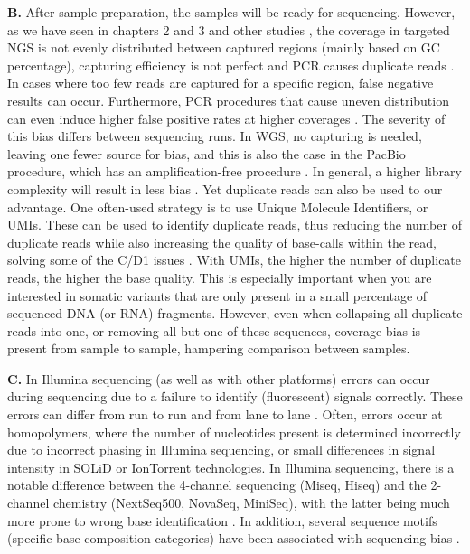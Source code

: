 \textbf{B.} After sample preparation, the samples will be ready for sequencing. 
However, as we have seen in chapters 2 and 3 and other studies \cite{Ross_2013}, the coverage in targeted NGS is not evenly distributed between captured regions (mainly based on GC percentage), capturing efficiency is not perfect and PCR causes duplicate reads \cite{Head_2014}. 
In cases where too few reads are captured for a specific region, false negative results can occur. 
Furthermore, PCR procedures that cause uneven distribution can even induce higher false positive rates at higher coverages \cite{Wall_2014}. 
The severity of this bias differs between sequencing runs. 
In WGS, no capturing is needed, leaving one fewer source for bias, and this is also the case in the PacBio procedure, which has an amplification-free procedure \cite{Quail_2012}. 
In general, a higher library complexity will result in less bias \cite{Head_2014}. 
Yet duplicate reads can also be used to our advantage. 
One often-used strategy  is to use Unique Molecule Identifiers, or UMIs. 
These can be used to identify duplicate reads, thus reducing the number of duplicate reads while also increasing the quality of base-calls within the read, solving some of the C/D1 issues \cite{Smith_2017a}. 
With UMIs, the higher the number of duplicate reads, the higher the base quality. 
This is especially important when you are interested in somatic variants that are only present in a small percentage of sequenced DNA (or RNA) fragments. 
However, even when collapsing all duplicate reads into one, or removing all but one of these sequences, coverage bias is present from sample to sample, hampering comparison between samples.

\textbf{C.} In Illumina sequencing (as well as with other platforms) errors can occur during sequencing  due to a failure to identify (fluorescent) signals correctly. 
These errors can differ from run to run and from lane to lane \cite{Aird_2011}. 
Often, errors occur at homopolymers, where the number of nucleotides present is determined incorrectly due to incorrect phasing in Illumina sequencing, or small differences in signal intensity in SOLiD or IonTorrent technologies. 
In Illumina sequencing, there is a notable difference between the 4-channel sequencing (Miseq, Hiseq) and the 2-channel chemistry (NextSeq500, NovaSeq, MiniSeq), with the latter being much more prone to wrong base identification \cite{Andrews_2016}. 
In addition, several sequence motifs (specific base composition categories) have been associated with sequencing bias \cite{Ross_2013}. 


